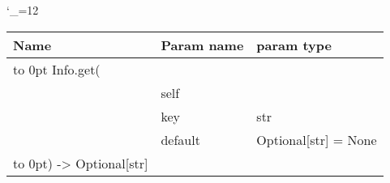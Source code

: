 \begingroup \catcode`\_=12 \tt
\begin{tabular}{lll}
\toprule
\textrm{Name}&\textrm{Param name}&\textrm{param type}\\
\midrule
\hbox to 0pt {Info.get(\hss}\\
& self\\
& key & str\\
& default & Optional[str] = None\\
\hbox to 0pt{) -> Optional[str]\hss}\\
\bottomrule
\end{tabular}
\endgroup
